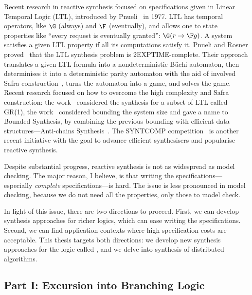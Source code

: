 Recent research in reactive synthesis focused on specifications
given in Linear Temporal Logic (LTL),
introduced by Pnueli~\cite{pnueli1977temporal} in 1977.
LTL has temporal operators, like $\G$ (always) and $\F$ (eventually),
and allows one to state properties like ``every request is eventually granted'':
$\G(r \impl \F g)$.
A system satisfies a given LTL property if all its computations satisfy it.
Pnueli and Rosner proved~\cite{DBLP:conf/popl/PnueliR89}
that the LTL synthesis problem is 2EXPTIME-complete.
Their approach translates a given LTL formula into a nondeterministic B\"uchi automaton,
then determinises it into a deterministic parity automaton
with the aid of involved Safra construction~\cite{Safra},
turns the automaton into a game, and solves the game.
Recent research focused on how to overcome the high complexity and Safra construction:
the work~\cite{Bloem12} considered the synthesis for a subset of LTL called GR(1),
the work~\cite{BS,KupfermanV05} considered bounding the system size and gave a name to Bounded Synthesis,
by combining the previous bounding with efficient data structures---Anti-chains Synthesis~\cite{Filiot11}.
The SYNTCOMP competition~\cite{syntcomp} is another recent initiative
with the goal to advance efficient synthesisers and popularise reactive synthesis.


Despite substantial progress,
reactive synthesis is not as widespread as model checking.
The major reason, I believe,
is that writing the specifications---especially \emph{complete} specifications---is hard.
The issue is less pronounced in model checking,
because we do not need all the properties,
only those to model check.


In light of this issue, there are two directions to proceed.
First, we can develop synthesis approaches for richer logics,
which can ease writing the specifications.
Second, we can find application contexts where high specification costs are acceptable.
This thesis targets both directions:
we develop new synthesis approaches for the logic called \CTLstar,
and we delve into synthesis of distributed algorithms.

\subsection*{Part I: Excursion into Branching Logic}

